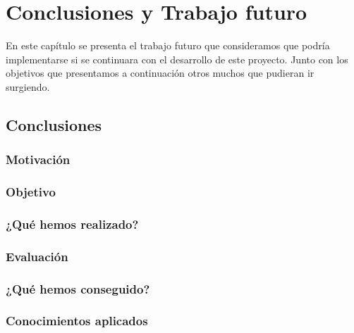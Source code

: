 
%
%
\setlength{\parskip}{10pt}
\chapter{Conclusiones y Trabajo futuro}

\begin{resumen}
En este capítulo se presenta el trabajo futuro que consideramos que podría implementarse si se continuara con el desarrollo de este proyecto. Junto con los objetivos que presentamos a continuación otros muchos que pudieran ir surgiendo.
\end{resumen}

\section{Conclusiones}
\label{cap11:sec:conclusiones}

\subsection{Motivación}
\label{cap11:sec:motivacion}

\subsection{Objetivo}
\label{cap11:sec:objetivo}

\subsection{¿Qué hemos realizado?}
\label{cap11:sec:que hemos realizado}

\subsection{Evaluación}
\label{cap11:sec:evaluacion}

\subsection{¿Qué hemos conseguido?}
\label{cap11:sec:que hemos conseguido}

\subsection{Conocimientos aplicados}
\label{cap11:sec:conocimientos aplicados}


